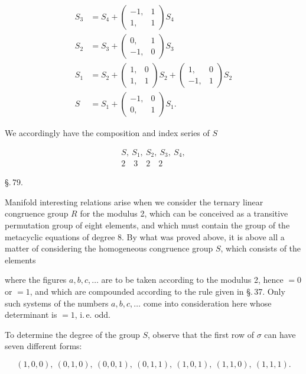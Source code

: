 \[
\begin{aligned}
S_3 &= S_4 + \begin{pmatrix} -1, & 1 \\ 1, & 1 \end{pmatrix} S_4 \\
S_2 &= S_3 + \begin{pmatrix} 0, & 1 \\ -1, & 0 \end{pmatrix} S_3 \\
S_1 &= S_2 + \begin{pmatrix} 1, & 0 \\ 1, & 1 \end{pmatrix} S_2 + \begin{pmatrix} 1, & 0 \\ -1, & 1 \end{pmatrix} S_2 \\
S &= S_1 + \begin{pmatrix} -1, & 0 \\ 0, & 1 \end{pmatrix} S_1.
\end{aligned}
\]

We accordingly have the composition and index series of $S$

\[
\begin{gathered}
S,\ S_1,\ S_2,\ S_3,\ S_4, \\
2 \quad 3 \quad 2 \quad 2
\end{gathered}
\]


\begin{center}
\S.\,79.

\end{center}

Manifold interesting relations arise when
we consider the ternary linear congruence group $R$ for the modulus 2,
which can be conceived as a transitive permutation group of eight
elements, and which must contain the group of the metacyclic
equations of degree 8. By what was
proved above, it is above all a matter of considering the homogeneous
congruence group $S$, which consists of the elements


where the figures $a, b, c, \ldots$ are to be taken according to the modulus 2, hence $= 0$
or $= 1$, and which are compounded according to the rule given
in \S.\,37. Only such systems
of the numbers $a, b, c, \ldots$ come into consideration here whose determinant
is $= 1$, i.\,e. odd.

To determine the degree of the group $S$, observe that
the first row of $\sigma$ can have seven different forms:

\[
(1,0,0),\ (0,1,0),\ (0,0,1),\ (0,1,1),\ (1,0,1),\ (1,1,0),\ (1,1,1).
\]
